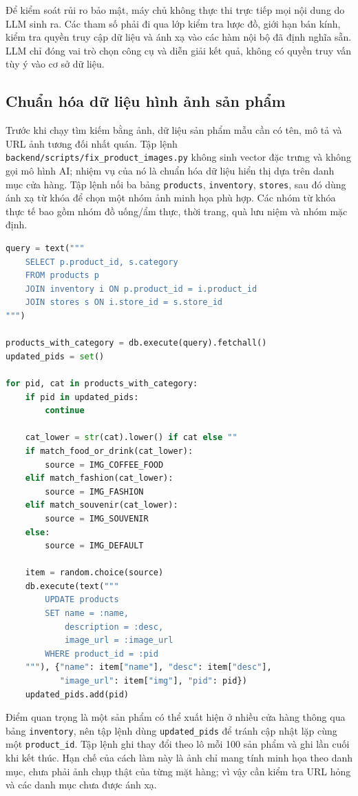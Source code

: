 \documentclass[12pt, a4paper]{article}
\begin{document}
Để kiểm soát rủi ro bảo mật, máy chủ không thực thi trực tiếp mọi nội dung do LLM sinh ra. Các tham số phải đi qua lớp kiểm tra lược đồ, giới hạn bán kính, kiểm tra quyền truy cập dữ liệu và ánh xạ vào các hàm nội bộ đã định nghĩa sẵn. LLM chỉ đóng vai trò chọn công cụ và diễn giải kết quả, không có quyền truy vấn tùy ý vào cơ sở dữ liệu.

\subsection{Chuẩn hóa dữ liệu hình ảnh sản phẩm}
Trước khi chạy tìm kiếm bằng ảnh, dữ liệu sản phẩm mẫu cần có tên, mô tả và URL ảnh tương đối nhất quán. Tập lệnh \texttt{backend/scripts/fix\_product\_images.py} không sinh vector đặc trưng và không gọi mô hình AI; nhiệm vụ của nó là chuẩn hóa dữ liệu hiển thị dựa trên danh mục cửa hàng. Tập lệnh nối ba bảng \texttt{products}, \texttt{inventory}, \texttt{stores}, sau đó dùng ánh xạ từ khóa để chọn một nhóm ảnh minh họa phù hợp. Các nhóm từ khóa thực tế bao gồm nhóm đồ uống/ẩm thực, thời trang, quà lưu niệm và nhóm mặc định.

\begin{lstlisting}[language=Python, caption={Luồng rút gọn chuẩn hóa ảnh sản phẩm theo danh mục cửa hàng}]
query = text("""
    SELECT p.product_id, s.category
    FROM products p
    JOIN inventory i ON p.product_id = i.product_id
    JOIN stores s ON i.store_id = s.store_id
""")

products_with_category = db.execute(query).fetchall()
updated_pids = set()

for pid, cat in products_with_category:
    if pid in updated_pids:
        continue

    cat_lower = str(cat).lower() if cat else ""
    if match_food_or_drink(cat_lower):
        source = IMG_COFFEE_FOOD
    elif match_fashion(cat_lower):
        source = IMG_FASHION
    elif match_souvenir(cat_lower):
        source = IMG_SOUVENIR
    else:
        source = IMG_DEFAULT

    item = random.choice(source)
    db.execute(text("""
        UPDATE products
        SET name = :name,
            description = :desc,
            image_url = :image_url
        WHERE product_id = :pid
    """), {"name": item["name"], "desc": item["desc"],
           "image_url": item["img"], "pid": pid})
    updated_pids.add(pid)
\end{lstlisting}

Điểm quan trọng là một sản phẩm có thể xuất hiện ở nhiều cửa hàng thông qua bảng \texttt{inventory}, nên tập lệnh dùng \texttt{updated\_pids} để tránh cập nhật lặp cùng một \texttt{product\_id}. Tập lệnh ghi thay đổi theo lô mỗi 100 sản phẩm và ghi lần cuối khi kết thúc. Hạn chế của cách làm này là ảnh chỉ mang tính minh họa theo danh mục, chưa phải ảnh chụp thật của từng mặt hàng; vì vậy cần kiểm tra URL hỏng và các danh mục chưa được ánh xạ.
\end{document}

